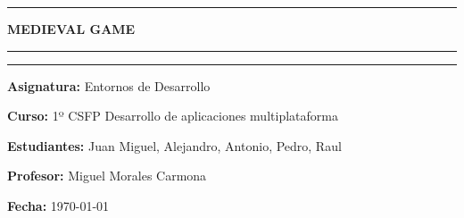 \documentclass[12pt,a4paper]{article}
\begin{document}
\begin{titlepage}
    \vspace{0.5 cm}
    \begin{center}
    \end{center}
    \vspace{1 cm}
    \rule{\textwidth}{1mm}
    \begin{center}
        \large \bfseries \textcolor{prussianblue}{MEDIEVAL GAME}
    \end{center}
    \rule{\textwidth}{1mm}
    \vspace{0.8cm}

    \begin{center}
    \end{center}
    \vspace{1cm}
    \rule{\textwidth}{1mm}
    \vspace{1cm}

    \hspace{1.2cm}
    
    \hspace{1cm}
    \begin{minipage}[b]{0.7\textwidth}
        \textbf{\normalsize\textcolor{prussianblue}{Asignatura:}} \normalsize{Entornos de Desarrollo}

        \textbf {\normalsize\textcolor{prussianblue}{Curso:}} \normalsize{1º CSFP Desarrollo de aplicaciones multiplataforma}

        \textbf{\normalsize \textcolor{prussianblue}{Estudiantes:}} \normalsize{Juan Miguel, Alejandro, Antonio, Pedro, Raul }

        \textbf{\normalsize \textcolor{prussianblue}{Profesor:}} \normalsize{Miguel Morales Carmona}
    \end{minipage}


    \vspace{1 cm}

    \begin{center}
        \textbf{\small \textcolor{prussianblue}{Fecha:}} \small{\today}

        \vfill
    \end{center}
\end{titlepage}
\end{document}
